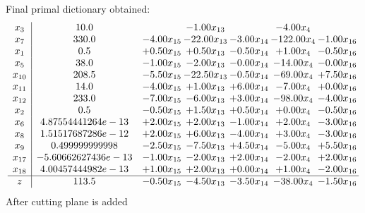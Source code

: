 \documentclass[8pt]{article}
\begin{document}
 Final primal dictionary obtained: 
\[\begin{array}{c| c c@{\hskip 2pt} c@{\hskip 2pt} c@{\hskip 2pt} c@{\hskip 2pt} c@{\hskip 2pt} }
 x_{3}   &  10.0  &   & -1.00 x_{13} &   & -4.00 x_{4} &   \\
 x_{7}   &  330.0 & -4.00 x_{15} & -22.00 x_{13} & -3.00 x_{14} & -122.00 x_{4} & -1.00 x_{16}\\
 x_{1}   &  0.5 & +  0.50 x_{15} & +  0.50 x_{13} & -0.50 x_{14} & +  1.00 x_{4} & -0.50 x_{16}\\
 x_{5}   &  38.0 & -1.00 x_{15} & -2.00 x_{13} & -0.00 x_{14} & -14.00 x_{4} & -0.00 x_{16}\\
 x_{10}   &  208.5 & -5.50 x_{15} & -22.50 x_{13} & -0.50 x_{14} & -69.00 x_{4} & +  7.50 x_{16}\\
 x_{11}   &  14.0 & -4.00 x_{15} & +  1.00 x_{13} & +  6.00 x_{14} & -7.00 x_{4} & +  0.00 x_{16}\\
 x_{12}   &  233.0 & -7.00 x_{15} & -6.00 x_{13} & +  3.00 x_{14} & -98.00 x_{4} & -4.00 x_{16}\\
 x_{2}   &  0.5 & -0.50 x_{15} & +  1.50 x_{13} & +  0.50 x_{14} & +  0.00 x_{4} & -0.50 x_{16}\\
 x_{6}   &  4.87554441264e-13 & +  2.00 x_{15} & +  2.00 x_{13} & -1.00 x_{14} & +  2.00 x_{4} & -3.00 x_{16}\\
 x_{8}   &  1.51517687286e-12 & +  2.00 x_{15} & +  6.00 x_{13} & -4.00 x_{14} & +  3.00 x_{4} & -3.00 x_{16}\\
 x_{9}   &  0.499999999998 & -2.50 x_{15} & -7.50 x_{13} & +  4.50 x_{14} & -5.00 x_{4} & +  5.50 x_{16}\\
 x_{17}   &  -5.60662627436e-13 & -1.00 x_{15} & -2.00 x_{13} & +  2.00 x_{14} & -2.00 x_{4} & +  2.00 x_{16}\\
 x_{18}   &  4.00457444982e-13 & +  1.00 x_{15} & +  2.00 x_{13} & +  0.00 x_{14} & +  1.00 x_{4} & -2.00 x_{16}\\
\hline
z    &  113.5 & -0.50 x_{15} & -4.50 x_{13} & -3.50 x_{14} & -38.00 x_{4} & -1.50 x_{16}\\
\end{array}\]
 After cutting plane is added 
\end{document}
